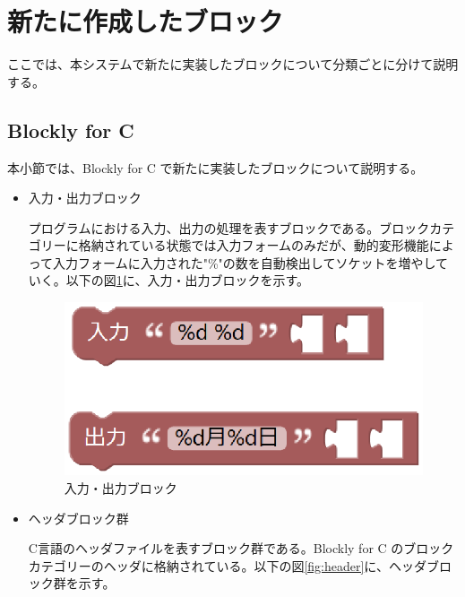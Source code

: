 \documentclass{eniepaper}
\begin{document}
   \section{新たに作成したブロック}

ここでは、本システムで新たに実装したブロックについて分類ごとに分けて説明する。
   
   \subsection{Blockly for C}

本小節では、Blockly for C で新たに実装したブロックについて説明する。

\begin{itemize}

\item 入力・出力ブロック

プログラムにおける入力、出力の処理を表すブロックである。ブロックカテゴリーに格納されている状態では入力フォームのみだが、動的変形機能によって入力フォームに入力された"\%"の数を自動検出してソケットを増やしていく。以下の図\ref{fig:inoutput}に、入力・出力ブロックを示す。

\begin{figure}[h]
\begin{center}
\includegraphics[scale=0.5]{img/inoutput.eps}
\caption{入力・出力ブロック}%
\label{fig:inoutput}
\end{center}%
\end{figure}%

\item ヘッダブロック群

C言語のヘッダファイルを表すブロック群である。Blockly for C のブロックカテゴリーのヘッダに格納されている。以下の図\ref{fig:header}に、ヘッダブロック群を示す。


\end{itemize}
\end{document}
